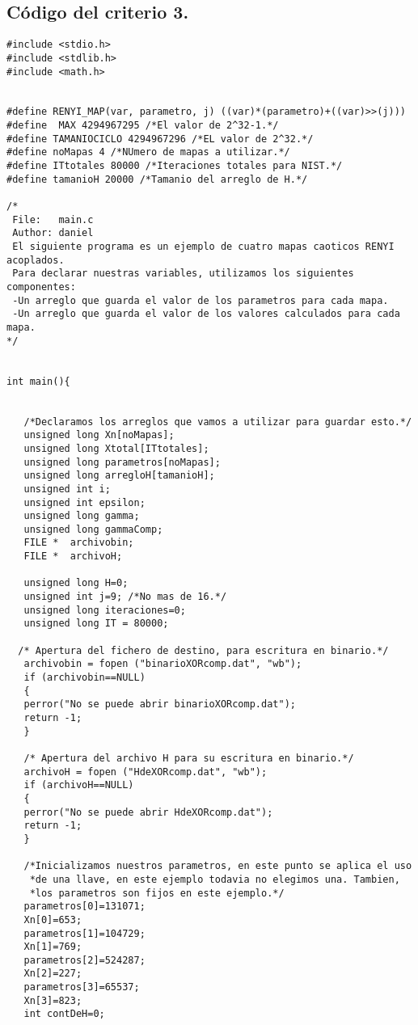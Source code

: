 \documentclass[12pt,3p]{elsarticle}
\begin{document}
\subsection{Código del criterio 3.}
\begin{verbatim}
#include <stdio.h>
#include <stdlib.h>
#include <math.h>


#define RENYI_MAP(var, parametro, j) ((var)*(parametro)+((var)>>(j)))
#define  MAX 4294967295 /*El valor de 2^32-1.*/
#define TAMANIOCICLO 4294967296 /*EL valor de 2^32.*/
#define noMapas 4 /*NUmero de mapas a utilizar.*/
#define ITtotales 80000 /*Iteraciones totales para NIST.*/
#define tamanioH 20000 /*Tamanio del arreglo de H.*/

/*
 File:   main.c
 Author: daniel
 El siguiente programa es un ejemplo de cuatro mapas caoticos RENYI acoplados.
 Para declarar nuestras variables, utilizamos los siguientes componentes:
 -Un arreglo que guarda el valor de los parametros para cada mapa.
 -Un arreglo que guarda el valor de los valores calculados para cada mapa.
*/


int main(){
 
   
   /*Declaramos los arreglos que vamos a utilizar para guardar esto.*/
   unsigned long Xn[noMapas];
   unsigned long Xtotal[ITtotales]; 
   unsigned long parametros[noMapas];
   unsigned long arregloH[tamanioH];
   unsigned int i;
   unsigned int epsilon;
   unsigned long gamma;
   unsigned long gammaComp;
   FILE *  archivobin; 
   FILE *  archivoH;
   
   unsigned long H=0; 
   unsigned int j=9; /*No mas de 16.*/
   unsigned long iteraciones=0;
   unsigned long IT = 80000;

  /* Apertura del fichero de destino, para escritura en binario.*/
   archivobin = fopen ("binarioXORcomp.dat", "wb");
   if (archivobin==NULL)
   {
   perror("No se puede abrir binarioXORcomp.dat");
   return -1;
   }
   
   /* Apertura del archivo H para su escritura en binario.*/
   archivoH = fopen ("HdeXORcomp.dat", "wb");
   if (archivoH==NULL)
   {
   perror("No se puede abrir HdeXORcomp.dat");
   return -1;
   }
   
   /*Inicializamos nuestros parametros, en este punto se aplica el uso
    *de una llave, en este ejemplo todavia no elegimos una. Tambien,
    *los parametros son fijos en este ejemplo.*/
   parametros[0]=131071;
   Xn[0]=653;
   parametros[1]=104729;
   Xn[1]=769;
   parametros[2]=524287;
   Xn[2]=227;
   parametros[3]=65537;
   Xn[3]=823;
   int contDeH=0;
                   

\end{verbatim}
\end{document}
